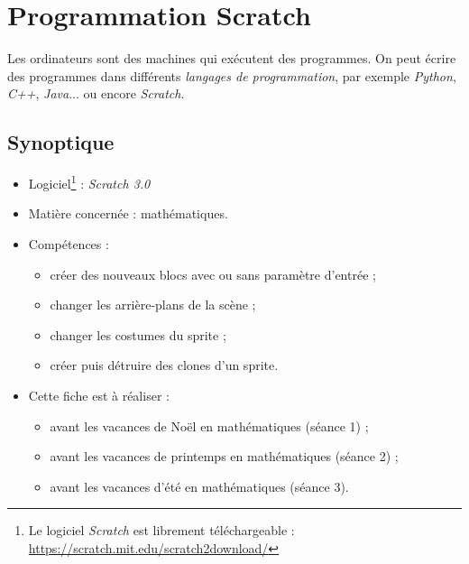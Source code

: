 \chapter{Programmation Scratch}  

Les ordinateurs sont des machines qui exécutent des programmes. On peut écrire des programmes dans différents \emph{langages de programmation}, par exemple \emph{Python}, \emph{C++}, \emph{Java}... ou encore \emph{Scratch}.

\section*{Synoptique}

{\footnotesize
\begin{itemize}
\item Logiciel\footnote{Le logiciel \emph{Scratch} est librement téléchargeable : \url{https://scratch.mit.edu/scratch2download/}} : \emph{Scratch 3.0}
\item Matière concernée : mathématiques.
\item Compétences : 
        \begin{itemize}
        \item créer des nouveaux blocs avec ou sans paramètre d'entrée ;
        \item changer les arrière-plans de la scène ;
        \item changer les costumes du sprite ;
        \item créer puis détruire des clones d'un sprite. 
        \end{itemize}
\item Cette fiche est à réaliser :
        \begin{itemize}
        \item avant les vacances de Noël en mathématiques (séance 1) ;
        \item avant les vacances de printemps en mathématiques (séance 2) ;
        \item avant les vacances d'été en mathématiques (séance 3). 
       \end{itemize}
\end{itemize}
}

\vspace{14pt}



